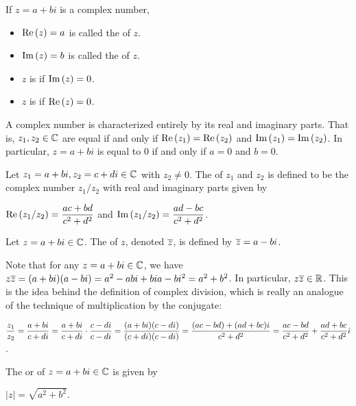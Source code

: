 \documentclass[11pt,fleqn,dvipsnames,usenames]{article}
\newcommand{\p}{\noindent}
\begin{document}
\begin{definition}
If $z = a + bi$ is a complex number,
\begin{itemize}
\item $\text{Re}\left(z\right) = a$ is called the  of $z$.
\item $\text{Im}\left(z\right) = b$ is called the  of $z$. 
\item $z$ is  if $\text{Im}\left(z\right) = 0$.
\item $z$ is  if $\text{Re}\left(z\right) = 0$.
\end{itemize}
\end{definition}

\note A complex number is characterized entirely by its real and imaginary parts.  That is, $z_{1},z_{2}\in\mathbb{C}$ are equal if and only if $\text{Re}\left(z_{1}\right) = \text{Re}\left(z_{2}\right)$ and $\text{Im}\left(z_{1}\right) = \text{Im}\left(z_{2}\right)$.  In particular, $z = a + bi$ is equal to $0$ if and only if $a = 0$ and $b = 0$.

\begin{definition}
Let $z_{1} = a+bi,z_{2} = c+di\in\mathbb{C}$ with $z_{2}\neq 0$.  The  of $z_{1}$ and $z_{2}$ is defined to be the complex number $z_{1}/z_{2}$ with real and imaginary parts given by
\begin{center}
$\text{Re}\left(z_{1}/z_{2}\right) = \dfrac{ac + bd}{c^2 + d^2}$ and $\text{Im}\left(z_{1}/z_{2}\right) = \dfrac{ad - bc}{c^2 + d^2}$.
\end{center}
\end{definition}

\begin{definition}
Let $z = a + bi\in\mathbb{C}$.  The  of $z$, denoted $\overline{z}$, is defined by $\overline{z} = a - bi$.
\end{definition}
\vsp

\p Note that for any $z = a + bi\in\mathbb{C}$, we have $z\overline{z} = (a + bi)(a - bi) = a^2 - abi + bia - bi^2 = a^2 + b^2$.  In particular, $z\overline{z}\in\mathbb{R}$.  This is the idea behind the definition of complex division, which is really an analogue of the technique of {multiplication by the conjugate}:

\begin{center}
$\displaystyle{\frac{z_{1}}{z_{2}} = \frac{a + bi}{c + di} = \frac{a + bi}{c + di}\cdot \frac{c - di}{c - di} = \frac{(a + bi)(c - di)}{(c + di)(c - di)} = \frac{(ac - bd) + (ad + bc)i}{c^2 + d^2} = \frac{ac - bd}{c^2 + d^2} + \frac{ad + bc}{c^2 + d^2}i}$.
\end{center}

\begin{definition}
The  or  of $z = a+bi\in\mathbb{C}$ is given by
\begin{center}
$|z| = \sqrt{a^2 + b^2}$.
\end{center}
\end{definition}
\end{document}
